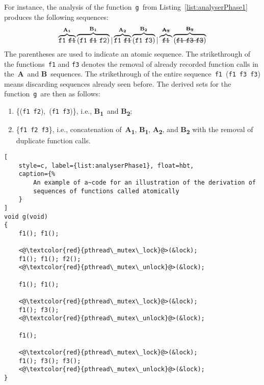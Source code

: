 \begin{example}
    For instance, the analysis of the function~\texttt{g}~from
    Listing~\ref{list:analyserPhase1} produces the following sequences:
    $$
        \overbrace{%
            \text{\texttt{f1}~\sout{\texttt{f1}}}
        }^\text{\textbf{A\textsubscript{1}}}
        \overbrace{%
            (\text{\texttt{f1}~\sout{\texttt{f1}}~\texttt{f2}})
        }^\text{\textbf{B\textsubscript{1}}} |
        \overbrace{%
            \text{\texttt{f1}~\sout{\texttt{f1}}}
        }^\text{\textbf{A\textsubscript{2}}}
        \overbrace{%
            (\text{\texttt{f1}~\texttt{f3}})
        }^\text{\textbf{B\textsubscript{2}}} |
        \overbrace{%
            \text{\sout{\texttt{f1}}}
        }^\text{\sout{\textbf{A\textsubscript{3}}}}
        \overbrace{%
            (\text{\sout{\texttt{f1}~\texttt{f3}~\texttt{f3}}})
        }^\text{\sout{\textbf{B\textsubscript{3}}}}
    $$
    The parentheses are used to indicate an atomic sequence. The
    strikethrough of the functions~\texttt{f1} and \texttt{f3} denotes
    the removal of already recorded function calls in
    the~\textbf{A}~and \textbf{B}~sequences. The strikethrough of the
    entire sequence~\texttt{f1}~(\texttt{f1}~\texttt{f3}~\texttt{f3})
    means discarding sequences already seen before. The derived sets for
    the function~\texttt{g}~are then as follows:
    \begin{enumerate}[label={(\roman*)}]
        \item
           \{(\texttt{f1}~\texttt{f2}),~(\texttt{f1}~\texttt{f3})\}, i.e.,
           \textbf{B\textsubscript{1}}~and \textbf{B\textsubscript{2}};

        \item
            \{\texttt{f1}~\texttt{f2}~\texttt{f3}\}, i.e.,
            concatenation of~\textbf{A\textsubscript{1}},
            \textbf{B\textsubscript{1}}, \textbf{A\textsubscript{2}},
            and \textbf{B\textsubscript{2}} with the removal of duplicate
            function calls.

    \end{enumerate}
\end{example}

\begin{lstlisting}[
    style=c, label={list:analyserPhase1}, float=hbt,
    caption={%
        An example of a~code for an illustration of the derivation of
        sequences of functions called atomically
    }
]
void g(void)
{
    f1(); f1();

    <@\textcolor{red}{pthread\_mutex\_lock}@>(&lock);
    f1(); f1(); f2();
    <@\textcolor{red}{pthread\_mutex\_unlock}@>(&lock);

    f1(); f1();

    <@\textcolor{red}{pthread\_mutex\_lock}@>(&lock);
    f1(); f3();
    <@\textcolor{red}{pthread\_mutex\_unlock}@>(&lock);

    f1();

    <@\textcolor{red}{pthread\_mutex\_lock}@>(&lock);
    f1(); f3(); f3();
    <@\textcolor{red}{pthread\_mutex\_unlock}@>(&lock);
}
\end{lstlisting}

